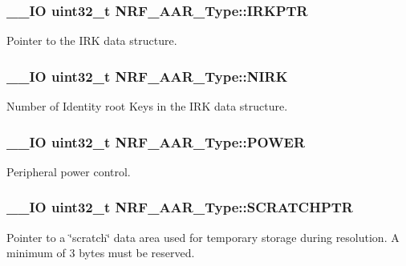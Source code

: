\subsubsection[{I\+R\+K\+P\+T\+R}]{\setlength{\rightskip}{0pt plus 5cm}\+\_\+\+\_\+\+I\+O uint32\+\_\+t N\+R\+F\+\_\+\+A\+A\+R\+\_\+\+Type\+::\+I\+R\+K\+P\+T\+R}\label{struct_n_r_f___a_a_r___type_a71ff34c1e88a616c5f05cebeca7c7889}
Pointer to the I\+R\+K data structure. \hypertarget{struct_n_r_f___a_a_r___type_abdbd58c3b3463816ac1a78fb80c1b1c9}{}
\subsubsection[{N\+I\+R\+K}]{\setlength{\rightskip}{0pt plus 5cm}\+\_\+\+\_\+\+I\+O uint32\+\_\+t N\+R\+F\+\_\+\+A\+A\+R\+\_\+\+Type\+::\+N\+I\+R\+K}\label{struct_n_r_f___a_a_r___type_abdbd58c3b3463816ac1a78fb80c1b1c9}
Number of Identity root Keys in the I\+R\+K data structure. \hypertarget{struct_n_r_f___a_a_r___type_a6b04afc96126c1b7aa83353081fd596b}{}
\subsubsection[{P\+O\+W\+E\+R}]{\setlength{\rightskip}{0pt plus 5cm}\+\_\+\+\_\+\+I\+O uint32\+\_\+t N\+R\+F\+\_\+\+A\+A\+R\+\_\+\+Type\+::\+P\+O\+W\+E\+R}\label{struct_n_r_f___a_a_r___type_a6b04afc96126c1b7aa83353081fd596b}
Peripheral power control. \hypertarget{struct_n_r_f___a_a_r___type_a47c5daf494f9af97819643464d8455bc}{}
\subsubsection[{S\+C\+R\+A\+T\+C\+H\+P\+T\+R}]{\setlength{\rightskip}{0pt plus 5cm}\+\_\+\+\_\+\+I\+O uint32\+\_\+t N\+R\+F\+\_\+\+A\+A\+R\+\_\+\+Type\+::\+S\+C\+R\+A\+T\+C\+H\+P\+T\+R}\label{struct_n_r_f___a_a_r___type_a47c5daf494f9af97819643464d8455bc}
Pointer to a \char`\"{}scratch\char`\"{} data area used for temporary storage during resolution. A minimum of 3 bytes must be reserved. \hypertarget{struct_n_r_f___a_a_r___type_a6370050a6b5e86260a134aa68badaa78}{}
